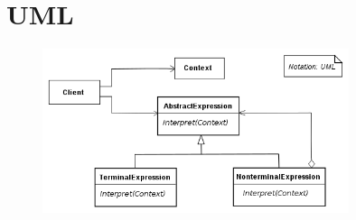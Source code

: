 
\section{UML}

\begin{figure}[H]
    \centering
        \includegraphics[width=0.8\textwidth]{figures/uml_class_diagram.png}
\end{figure}
